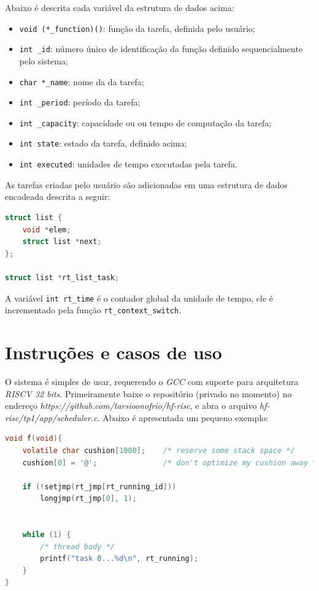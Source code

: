 \documentclass[a4 paper]{article}
\begin{document}
Abaixo é descrita cada variável da estrutura de dados acima:
\begin{itemize}
\item \verb|void (*_function)()|: função da tarefa, definida pelo usuário;
\item \verb|int _id|: número único de identificação da função definido sequencialmente pelo sistema;
\item \verb|char *_name|: nome da da tarefa; 
\item \verb|int _period|: período da tarefa;
\item \verb|int _capacity|: capacidade ou ou tempo de computação da tarefa;  
\item \verb|int state|: estado da tarefa, definido acima;
\item \verb|int executed|: unidades de tempo executadas pela tarefa.
\end{itemize}


As tarefas criadas pelo usuário são adicionadas em uma estrutura de dados encadeada descrita a seguir:
\begin{lstlisting}[captionpos=b, language=C, caption=Lista encadeada]
struct list {
	void *elem;
	struct list *next;
};

struct list *rt_list_task;
\end{lstlisting}


A variável \verb|int rt_time|  é o contador global da unidade de tempo, ele é incrementado pela função 
\verb|rt_context_switch|.


\section{Instruções e casos de uso}


O sistema é simples de usar, requerendo o \textit{GCC} com suporte para arquitetura \textit{RISCV 32 bits}. Primeiramente baixe o repositório (privado no momento) no endereço \textit{https://github.com/tarsioonofrio/hf-risc}, e abra o arquivo  \textit{hf-risc/tp1/app/scheduler.c}. Abaixo é apresentada um pequeno exemplo:

\begin{lstlisting}[captionpos=b, language=C, caption=Função de exemplo]
void f(void){
    volatile char cushion[1000];	/* reserve some stack space */
    cushion[0] = '@';	        	/* don't optimize my cushion away */

    if (!setjmp(rt_jmp[rt_running_id]))
        longjmp(rt_jmp[0], 1);


    while (1) {
        /* thread body */
        printf("task 0...%d\n", rt_running);
    }
}
\end{lstlisting}
\end{document}
